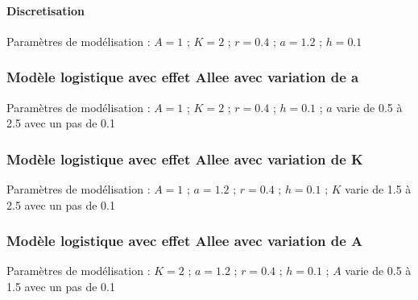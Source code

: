 \documentclass{article}
\begin{document}
\paragraph{}

\paragraph{Discretisation}
\begin{center}
\end{center}
Paramètres de modélisation : $A=1$  ; $K=2$  ; $r=0.4$  ; $a = 1.2$ ; $h=0.1$
\paragraph{}

\subsubsection{Modèle logistique avec effet Allee avec variation de a}
\begin{center}
\end{center}
Paramètres de modélisation : $A=1$  ; $K=2$  ; $r=0.4$  ; $h=0.1$ ; $a$ varie de 0.5 à 2.5 avec un pas de 0.1
\paragraph{}

\subsubsection{Modèle logistique avec effet Allee avec variation de K}
\begin{center}
\end{center}
Paramètres de modélisation : $A=1$  ; $a=1.2$  ; $r=0.4$  ; $h=0.1$ ; $K$ varie de 1.5 à 2.5 avec un pas de 0.1
\paragraph{}

\subsubsection{Modèle logistique avec effet Allee avec variation de A}
\begin{center}
\end{center}
Paramètres de modélisation : $K=2$  ; $a=1.2$  ; $r=0.4$  ; $h=0.1$ ; $A$ varie de 0.5 à 1.5 avec un pas de 0.1
\end{document}
